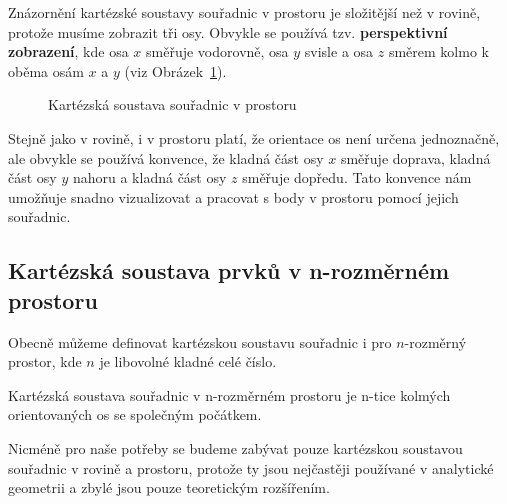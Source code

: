 Znázornění kartézské soustavy souřadnic v prostoru je složitější než v rovině, protože musíme zobrazit tři osy.
Obvykle se používá tzv. \textbf{perspektivní zobrazení}, kde osa $x$ směřuje vodorovně, osa $y$ svisle a osa $z$ směrem kolmo k oběma osám $x$ a $y$ (viz Obrázek~\ref{fig:cartesian_space}).

\begin{figure}[H] 
    \centering
    \caption{Kartézská soustava souřadnic v prostoru}
    \label{fig:cartesian_space}
\end{figure}

\begin{remark}
    Stejně jako v rovině, i v prostoru platí, že orientace os není určena jednoznačně, ale obvykle se používá konvence, že kladná část osy $x$ směřuje doprava, kladná část osy $y$ nahoru a kladná část osy $z$ směřuje dopředu. 
    Tato konvence nám umožňuje snadno vizualizovat a pracovat s body v prostoru pomocí jejich souřadnic.
\end{remark}


\subsection{Kartézská soustava prvků v n-rozměrném prostoru}\label{subsec:Cartesian_coordinate_system_n}
Obecně můžeme definovat kartézskou soustavu souřadnic i pro $n$-rozměrný prostor, kde $n$ je libovolné kladné celé číslo.
\begin{definition}\label{def:karteska_soustava_n}
    Kartézská soustava souřadnic v n-rozměrném prostoru je n-tice kolmých orientovaných os se společným počátkem.
\end{definition}

Nicméně pro naše potřeby se budeme zabývat pouze kartézskou soustavou souřadnic v rovině a prostoru, protože ty jsou nejčastěji používané v analytické geometrii a zbylé jsou pouze teoretickým rozšířením.







